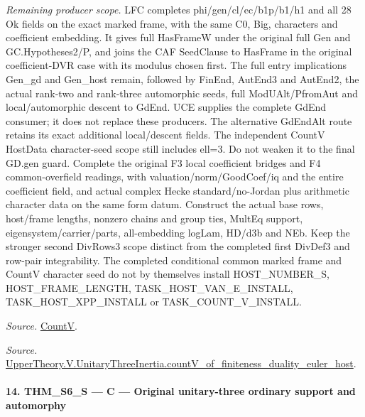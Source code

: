 \documentclass[11pt,a4paper]{article}
\numberwithin{equation}{section}
\theoremstyle{remark}\newtheorem{remark}[theorem]{Remark}
\begin{document}
\emph{Remaining producer scope.} LFC completes phi/gen/cl/ec/b1p/b1/h1 and all 28 Ok fields on the exact marked frame, with the same C0, Big, characters and coefficient embedding. It gives full HasFrameW under the original full Gen and GC.Hypotheses2/P, and joins the CAF SeedClause to HasFrame in the original coefficient-DVR case with its modulus chosen first. The full entry implications Gen\_\allowbreak gd and Gen\_\allowbreak host remain, followed by FinEnd, AutEnd3 and AutEnd2, the actual rank-two and rank-three automorphic seeds, full ModUAlt/PfromAut and local/automorphic descent to GdEnd. UCE supplies the complete GdEnd consumer; it does not replace these producers. The alternative GdEndAlt route retains its exact additional local/descent fields. The independent CountV HostData character-seed scope still includes ell=3. Do not weaken it to the final GD.gen guard. Complete the original F3 local coefficient bridges and F4 common-overfield readings, with valuation/norm/GoodCoef/iq and the entire coefficient field, and actual complex Hecke standard/no-Jordan plus arithmetic character data on the same form datum. Construct the actual base rows, host/frame lengths, nonzero chains and group ties, MultEq support, eigensystem/carrier/parts, all-embedding logLam, HD/d3b and NEb. Keep the stronger second DivRows3 scope distinct from the completed first DivDef3 and row-pair integrability. The completed conditional common marked frame and CountV character seed do not by themselves install HOST\_\allowbreak NUMBER\_\allowbreak S, HOST\_\allowbreak FRAME\_\allowbreak LENGTH, TASK\_\allowbreak HOST\_\allowbreak VAN\_\allowbreak E\_\allowbreak INSTALL, TASK\_\allowbreak HOST\_\allowbreak XPP\_\allowbreak INSTALL or TASK\_\allowbreak COUNT\_\allowbreak V\_\allowbreak INSTALL.

\emph{Source.} \href{https://github.com/CocoSgt/riemann-hypothesis-lean/blob/7cbf7a0c32fca1badf05931879a37c3f8a2b03b4/src/Development/AutomorphicArithmetic/AutomorphicVarieties/HeightAndVanishing/Counts.lean#L69-L69}{CountV}.

\emph{Source.} \href{https://github.com/CocoSgt/riemann-hypothesis-lean/blob/7cbf7a0c32fca1badf05931879a37c3f8a2b03b4/src/Development/AutomorphicArithmetic/AutomorphicVarieties/ModularityArgument/ThresholdArguments/DenseThresholdCases/CountVOf.lean#L33-L60}{UpperTheory.V.UnitaryThreeInertia.countV\_\allowbreak of\_\allowbreak finiteness\_\allowbreak duality\_\allowbreak euler\_\allowbreak host}.



\paragraph{14. THM\_\allowbreak S6\_\allowbreak S — C — Original unitary-three ordinary support and automorphy}
\end{document}
